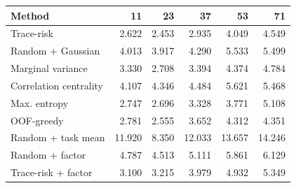 \begin{tabular}{lrrrrr}
\toprule
Method & 11 & 23 & 37 & 53 & 71 \\
\midrule
Trace-risk & 2.622 & 2.453 & 2.935 & 4.049 & 4.549 \\
Random + Gaussian & 4.013 & 3.917 & 4.290 & 5.533 & 5.499 \\
Marginal variance & 3.330 & 2.708 & 3.394 & 4.374 & 4.784 \\
Correlation centrality & 4.107 & 4.346 & 4.484 & 5.621 & 5.468 \\
Max. entropy & 2.747 & 2.696 & 3.328 & 3.771 & 5.108 \\
OOF-greedy & 2.781 & 2.555 & 3.652 & 4.312 & 4.351 \\
Random + task mean & 11.920 & 8.350 & 12.033 & 13.657 & 14.246 \\
Random + factor & 4.787 & 4.513 & 5.111 & 5.861 & 6.129 \\
Trace-risk + factor & 3.100 & 3.215 & 3.979 & 4.932 & 5.349 \\
\bottomrule
\end{tabular}
